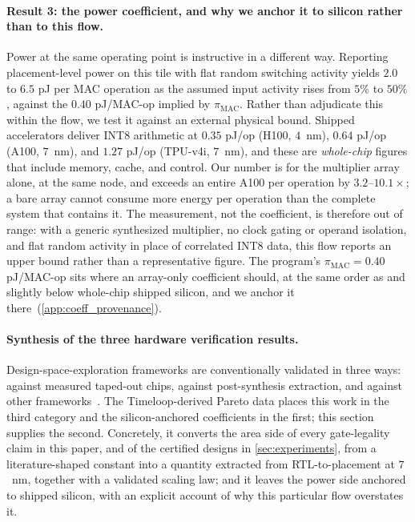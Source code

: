 \paragraph{Result 3: the power coefficient, and why we anchor it to silicon
rather than to this flow.}
Power at the same operating point is instructive in a different way. Reporting
placement-level power on this tile with flat random switching activity yields
$2.0$ to $6.5$ pJ per MAC operation as the assumed input activity rises from
$5\%$ to $50\%$, against the $0.40$ pJ/MAC-op implied by
$\pi_{\mathrm{MAC}}$. Rather than adjudicate this within the flow, we test it
against an external physical bound. Shipped accelerators deliver INT8
arithmetic at $0.35$ pJ/op (H100, $4$~nm), $0.64$ pJ/op (A100, $7$~nm), and
$1.27$ pJ/op (TPU-v4i, $7$~nm), and these are \emph{whole-chip} figures that
include memory, cache, and control. Our number is for the multiplier array
alone, at the same node, and exceeds an entire A100 per operation by
$3.2$--$10.1\times$; a bare array cannot consume more energy per operation than
the complete system that contains it. The measurement, not the coefficient, is
therefore out of range: with a generic synthesized multiplier, no clock gating
or operand isolation, and flat random activity in place of correlated INT8
data, this flow reports an upper bound rather than a representative figure. The
program's $\pi_{\mathrm{MAC}} = 0.40$ pJ/MAC-op sits where an array-only
coefficient should, at the same order as and slightly below whole-chip shipped
silicon, and we anchor it there~(\cref{app:coeff_provenance}).

\paragraph{Synthesis of the three hardware verification results.}
Design-space-exploration frameworks are conventionally validated in three ways:
against measured taped-out chips, against post-synthesis extraction, and
against other frameworks~\citep{mei2021zigzag}. The Timeloop-derived Pareto
data places this work in the third category and the silicon-anchored
coefficients in the first; this section supplies the second. Concretely, it
converts the area side of every gate-legality claim in this paper, and of the
certified designs in \cref{sec:experiments}, from a literature-shaped constant
into a quantity extracted from RTL-to-placement at $7$~nm, together with a
validated scaling law; and it leaves the power side anchored to shipped
silicon, with an explicit account of why this particular flow overstates it.

